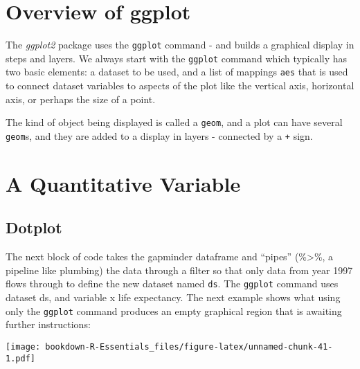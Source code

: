 \documentclass[]{book}
\newenvironment{Shaded}{\begin{snugshade}}{\end{snugshade}}
\newcommand{\KeywordTok}[1]{\textcolor[rgb]{0.13,0.29,0.53}{\textbf{#1}}}
\newcommand{\DataTypeTok}[1]{\textcolor[rgb]{0.13,0.29,0.53}{#1}}
\newcommand{\DecValTok}[1]{\textcolor[rgb]{0.00,0.00,0.81}{#1}}
\newcommand{\StringTok}[1]{\textcolor[rgb]{0.31,0.60,0.02}{#1}}
\newcommand{\CommentTok}[1]{\textcolor[rgb]{0.56,0.35,0.01}{\textit{#1}}}
\newcommand{\OperatorTok}[1]{\textcolor[rgb]{0.81,0.36,0.00}{\textbf{#1}}}
\newcommand{\NormalTok}[1]{#1}
\begin{document}
\section{Overview of ggplot}\label{overview-of-ggplot}

The \emph{ggplot2} package uses the \texttt{ggplot} command - and builds
a graphical display in steps and layers. We always start with the
\texttt{ggplot} command which typically has two basic elements: a
dataset to be used, and a list of mappings \texttt{aes} that is used to
connect dataset variables to aspects of the plot like the vertical axis,
horizontal axis, or perhaps the size of a point.

The kind of object being displayed is called a \texttt{geom}, and a plot
can have several \texttt{geom}s, and they are added to a display in
layers - connected by a \texttt{+} sign.

\section{A Quantitative Variable}\label{a-quantitative-variable}

\subsection{Dotplot}\label{dotplot}

The next block of code takes the gapminder dataframe and ``pipes''
(\%\textgreater{}\%, a pipeline like plumbing) the data through a filter
so that only data from year 1997 flows through to define the new dataset
named \texttt{ds}. The \texttt{ggplot} command uses dataset ds, and
variable x life expectancy. The next example shows what using only the
\texttt{ggplot} command produces an empty graphical region that is
awaiting further instructions:

\begin{Shaded}
\end{Shaded}

\texttt{[image: bookdown-R-Essentials\_files/figure-latex/unnamed-chunk-41-1.pdf]}
\end{document}
